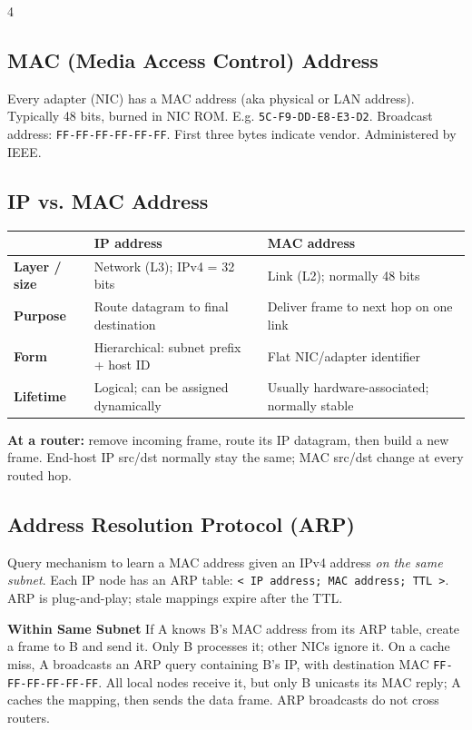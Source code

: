 \documentclass[10pt]{extarticle}
\begin{document}
\begin{multicols}{4}
\subsection{MAC (Media Access Control) Address}
Every adapter (NIC) has a MAC address (aka physical or LAN address). Typically 48 bits, burned in NIC ROM. E.g. \texttt{5C-F9-DD-E8-E3-D2}.
Broadcast address: \texttt{FF-FF-FF-FF-FF-FF}.
First three bytes indicate vendor. Administered by IEEE.

\subsection{IP vs. MAC Address}
\begingroup
\renewcommand{\arraystretch}{1.05}
\begin{tabular}{@{}p{1.15cm}p{2.3cm}p{2.3cm}@{}}
\toprule
& \textbf{IP address} & \textbf{MAC address} \\
\midrule
\textbf{Layer / size} & Network (L3); IPv4 = 32 bits & Link (L2); normally 48 bits \\
\textbf{Purpose} & Route datagram to final destination & Deliver frame to next hop on one link \\
\textbf{Form} & Hierarchical: subnet prefix + host ID & Flat NIC/adapter identifier \\
\textbf{Lifetime} & Logical; can be assigned dynamically & Usually hardware-associated; normally stable \\
\bottomrule
\end{tabular}
\endgroup

\textbf{At a router:} remove incoming frame, route its IP datagram, then build a new frame. End-host IP src/dst normally stay the same; MAC src/dst change at every routed hop.

\subsection{Address Resolution Protocol (ARP)}
Query mechanism to learn a MAC address given an IPv4 address \emph{on the
same subnet}. Each IP node has an ARP table:
\texttt{< IP address; MAC address; TTL >}. ARP is plug-and-play; stale
mappings expire after the TTL.

\textbf{Within Same Subnet}
If A knows B’s MAC address from its ARP table, create a frame to B and send
it. Only B processes it; other NICs ignore it. On a cache miss, A broadcasts
an ARP query containing B's IP, with destination MAC
\texttt{FF-FF-FF-FF-FF-FF}. All local nodes receive it, but only B unicasts
its MAC reply; A caches the mapping, then sends the data frame. ARP broadcasts
do not cross routers.


\end{multicols}
\end{document}
